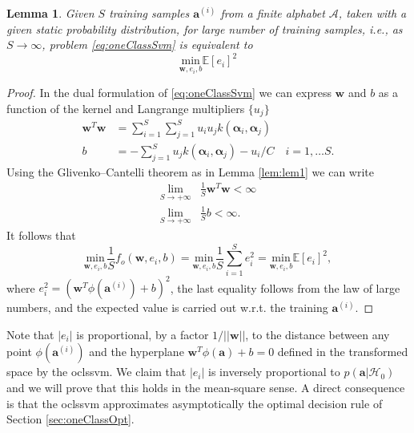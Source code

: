 \documentclass[draftcls,onecolumn,12pt]{IEEEtran}
\newcommand{\wrt}{w.r.t. }
\newcommand{\Exp}[1]{\mathbb{E}\left[#1\right]}
\newtheorem{lemma}{Lemma}
\begin{document}
\begin{lemma}
\label{lem:lem2}
Given $S$ training samples $\bm{a}^{(i)}$ from a finite alphabet $\mathcal A$, taken with a given static probability distribution, for large number of training samples, i.e., as $S \rightarrow \infty$, problem \eqref{eq:oneClassSvm} is equivalent to 
\begin{equation}
		\underset{\mathbf{w},e_i, b}{\text{min}} \Exp{e_i}^2
\end{equation}
\end{lemma}
\begin{proof}
In the dual formulation of \eqref{eq:oneClassSvm} we can express $\mathbf{w}$ and $b$ as a function of the kernel and Langrange multipliers $\{u_j\}$ \cite{choi2009least}
\begin{equation}
\begin{aligned}
\mathbf{w}^T\mathbf{w} &= \sum_{i=1}^{S} \sum_{j=1}^{S} u_i u_j k(\bm{\alpha}_i,\bm{\alpha}_j) \\
b &= - \sum_{j=1}^{S} u_j k(\bm{\alpha}_i,\bm{\alpha}_j) - u_i/C  \quad i=1,\dots S.
\end{aligned}		
\end{equation}
Using the Glivenko–Cantelli theorem as in Lemma \ref{lem:lem1} we can write
\begin{equation}
\begin{aligned}
\lim_{S \to +\infty} &\frac{1}{S} \mathbf{w}^T\mathbf{w} < \infty \\
\lim_{S \to +\infty} &\frac{1}{S}b < \infty.
\end{aligned}		
\end{equation}
It follows that
\begin{equation}
	\underset{\mathbf{w},e_i, b}{\text{min}} \frac{1}{S} f_o(\mathbf{w},e_i, b) = 
	\underset{\mathbf{w},e_i, b}{\text{min}} \frac{1}{S} \sum_{i=1}^S e_i^2 = \underset{\mathbf{w},e_i, b}{\text{min}} \Exp{e_i}^2,	
\end{equation}
where $e_i^2 = (\mathbf{w}^T \phi (\mathbf{a}^{(i)}) + b)^2 $, the last equality follows from the law of large numbers, and the expected value is carried out \wrt the training $\mathbf{a}^{(i)}$.
\end{proof}

Note that $|e_i|$ is proportional, by a factor $1/||\mathbf{w}||$, to the distance between any point $\phi(\mathbf{a}^{(i)})$ and the hyperplane $\mathbf{w}^T \phi (\mathbf{a}) + b = 0$ defined in the transformed space by the \ac{oclssvm}. We claim that $|e_i|$ is inversely proportional to $p(\mathbf{a}|\mathcal{H}_0)$ and we will prove that this holds in the mean-square sense. A direct consequence is that the \ac{oclssvm} approximates asymptotically the optimal decision rule of Section \ref{sec:oneClassOpt}. 
\end{document}
